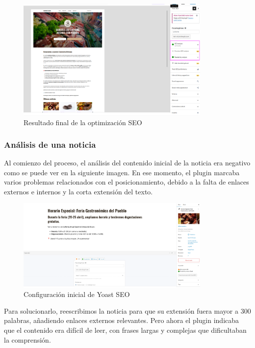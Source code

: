 \documentclass[a4paper]{article}
\begin{document}
\begin{figure}[H]
    \centering
    \includegraphics[width=0.85\textwidth]{images/yoastl3.png}
    \caption{Resultado final de la optimización SEO}
\end{figure}


\subsubsection{Análisis de una noticia}

Al comienzo del proceso, el análisis del contenido inicial de la noticia era negativo como se puede ver en la siguiente imagen. En ese momento, el plugin marcaba varios problemas relacionados con el posicionamiento, debido a la falta de enlaces externos e internos y la corta extensión del texto.

\begin{figure}[H]
    \centering
    \includegraphics[width=0.85\textwidth]{images/yoast2.png}
    \caption{Configuración inicial de Yoast SEO}
\end{figure}

Para solucionarlo, reescribimos la noticia para que su extensión fuera mayor a 300 palabras, añadiendo enlaces externos relevantes. Pero ahora el plugin indicaba que el contenido era difícil de leer, con frases largas y complejas que dificultaban la comprensión.
\end{document}
